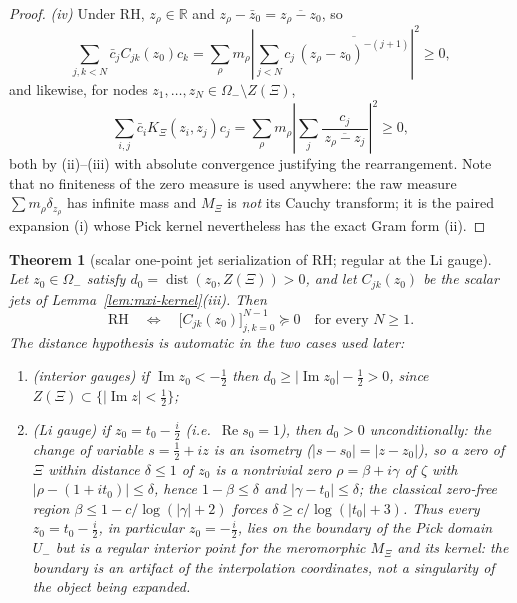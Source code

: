 \documentclass[11pt]{amsart}
\newtheorem{theorem}{Theorem}[section]
\theoremstyle{definition}
\theoremstyle{remark}
\theoremstyle{definition}
\renewcommand{\Re}{\operatorname{Re}}
\renewcommand{\Im}{\operatorname{Im}}
\newcommand{\half}{\tfrac{1}{2}}
\newcommand{\R}{\mathbb{R}}
\begin{document}
\begin{proof}
\emph{(iv)}  Under RH, $z_\rho\in\R$ and $z_\rho-\bar z_0=\overline{z_\rho-z_0}$, so
\[
   \sum_{j,k<N}\bar c_j C_{jk}(z_0)c_k
   =
   \sum_\rho m_\rho\left|\sum_{j<N}c_j\,\overline{(z_\rho-z_0)^{-(j+1)}}\right|^2\ge0 ,
\]
and likewise, for nodes $z_1,\ldots,z_N\in\Omega_-\setminus Z(\Xi)$,
\[
   \sum_{i,j}\bar c_i K_\Xi(z_i,z_j)c_j
   =
   \sum_\rho m_\rho\left|\sum_j\frac{c_j}{\,\overline{z_\rho-z_j}\,}\right|^2\ge0 ,
\]
both by (ii)--(iii) with absolute convergence justifying the rearrangement.  Note that no finiteness of
the zero measure is used anywhere: the raw measure $\sum m_\rho\delta_{z_\rho}$ has infinite mass and
$M_\Xi$ is \emph{not} its Cauchy transform; it is the paired expansion (i) whose Pick kernel
nevertheless has the exact Gram form (ii).
\end{proof}

\begin{theorem}[scalar one-point jet serialization of RH; regular at the Li gauge]\label{thm:scalar-jets}
Let $z_0\in\Omega_-$ satisfy $d_0=\operatorname{dist}(z_0,Z(\Xi))>0$, and let $C_{jk}(z_0)$ be the
scalar jets of Lemma~\ref{lem:mxi-kernel}(iii).  Then
\[
   \mathrm{RH}
   \quad\Longleftrightarrow\quad
   \bigl[C_{jk}(z_0)\bigr]_{j,k=0}^{N-1}\succeq0
   \quad\text{for every }N\ge1 .
\]
The distance hypothesis is automatic in the two cases used later:
\begin{enumerate}[label=\textnormal{(\alph*)}]
\item \textnormal{(interior gauges)} if $\Im z_0<-\half$ then $d_0\ge|\Im z_0|-\half>0$, since
$Z(\Xi)\subset\{|\Im z|<\half\}$;
\item \textnormal{(Li gauge)} if $z_0=t_0-\tfrac i2$ (i.e.\ $\Re s_0=1$), then $d_0>0$
unconditionally: the change of variable $s=\half+iz$ is an isometry ($|s-s_0|=|z-z_0|$), so a zero of
$\Xi$ within distance $\delta\le1$ of $z_0$ is a nontrivial zero $\rho=\beta+i\gamma$ of $\zeta$ with
$|\rho-(1+it_0)|\le\delta$, hence $1-\beta\le\delta$ and $|\gamma-t_0|\le\delta$; the classical
zero-free region $\beta\le1-c/\log(|\gamma|+2)$ \cite[Ch.~III]{Titchmarsh} forces
$\delta\ge c/\log(|t_0|+3)$.  Thus every $z_0=t_0-\tfrac i2$, in particular $z_0=-\tfrac i2$, lies on the boundary of the Pick domain $U_-$ but is
a \emph{regular interior point} for the meromorphic $M_\Xi$ and its kernel: the boundary is an artifact
of the interpolation coordinates, not a singularity of the object being expanded.
\end{enumerate}
\end{theorem}
\end{document}
